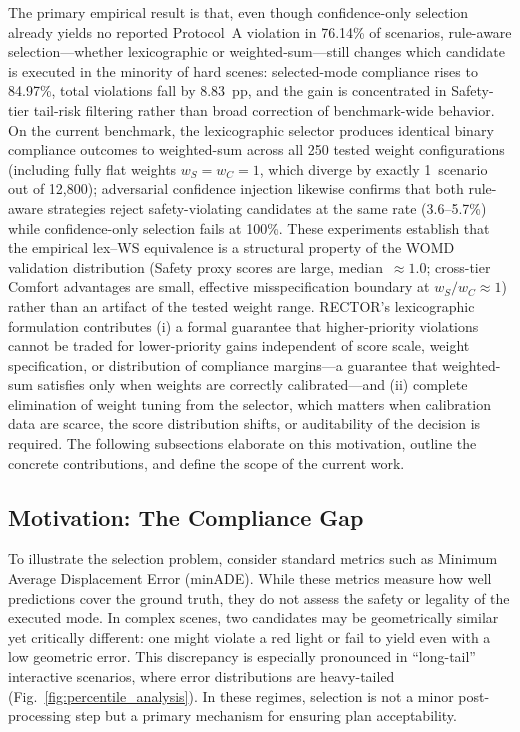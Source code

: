 The primary empirical result is that, even though confidence-only selection already yields no reported Protocol~A violation in 76.14\% of scenarios, rule-aware selection---whether lexicographic or weighted-sum---still changes which candidate is executed in the minority of hard scenes: selected-mode compliance rises to 84.97\%, total violations fall by 8.83~pp, and the gain is concentrated in Safety-tier tail-risk filtering rather than broad correction of benchmark-wide behavior.  On the current benchmark, the lexicographic selector produces identical binary compliance outcomes to weighted-sum across all 250 tested weight configurations (including fully flat weights $w_S{=}w_C{=}1$, which diverge by exactly 1~scenario out of 12{,}800); adversarial confidence injection likewise confirms that both rule-aware strategies reject safety-violating candidates at the same rate (3.6--5.7\%) while confidence-only selection fails at 100\%.  These experiments establish that the empirical lex--WS equivalence is a structural property of the WOMD validation distribution (Safety proxy scores are large, median~$\approx 1.0$; cross-tier Comfort advantages are small, effective misspecification boundary at $w_S/w_C\approx1$) rather than an artifact of the tested weight range.  RECTOR's lexicographic formulation contributes (i) a formal guarantee that higher-priority violations cannot be traded for lower-priority gains independent of score scale, weight specification, or distribution of compliance margins---a guarantee that weighted-sum satisfies only when weights are correctly calibrated---and (ii) complete elimination of weight tuning from the selector, which matters when calibration data are scarce, the score distribution shifts, or auditability of the decision is required.  The following subsections elaborate on this motivation, outline the concrete contributions, and define the scope of the current work.

\subsection{Motivation: The Compliance Gap}
\label{subsec:motivation}

To illustrate the selection problem, consider standard metrics such as Minimum Average Displacement Error (minADE).  While these metrics measure how well predictions cover the ground truth, they do not assess the safety or legality of the executed mode.  In complex scenes, two candidates may be geometrically similar yet critically different: one might violate a red light or fail to yield even with a low geometric error.  This discrepancy is especially pronounced in ``long-tail'' interactive scenarios, where error distributions are heavy-tailed (Fig.~\ref{fig:percentile_analysis}).  In these regimes, selection is not a minor post-processing step but a primary mechanism for ensuring plan acceptability.

